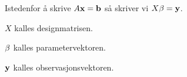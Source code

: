 Istedenfor å skrive $A\mathbf{x}=\mathbf{b}$ så skriver vi $X\mathbf{\beta}=\mathbf{y}$.

$X$ kalles designmatrisen.

$\mathbf{\beta}$ kalles parametervektoren.

$\mathbf{y}$ kalles observasjonsvektoren.
